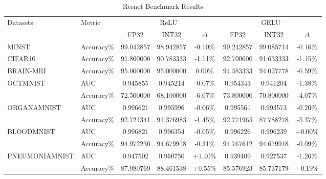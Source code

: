 \documentclass{article}
\begin{document}
\begin{table}[ht]
\centering
\caption{Resnet Benchmark Results}
\begin{tabular}{|l|l|c|c|c|c|c|c|}
\hline
\multirow{2}{*}{Datasets} & \multirow{2}{*}{Metric} & \multicolumn{3}{c|}{ReLU} & \multicolumn{3}{c|}{GELU} \\
\cline{3-8}
& & FP32 & INT32 & $\Delta$ & FP32 & INT32 & $\Delta$ \\
\hline
MINST & Accuracy\% & 99.042857 & 98.942857 & -0.10\% & 99.242857 & 99.085714 & -0.16\% \\
\hline
CIFAR10 & Accuracy\% & 91.800000 & 90.783333 & -1.11\% & 92.700000 & 91.633333 & -1.15\% \\
\hline
BRAIN-MRI & Accuracy\% & 95.000000 & 95.000000 & 0.00\% & 94.583333 & 94.027778 & -0.59\% \\
\hline
OCTMNIST & AUC & 0.945855 & 0.945214 & -0.07\% & 0.954343 & 0.941204 & -1.38\% \\
 & Accuracy\% & 72.500000 & 68.100000 & -6.07\% & 73.800000 & 70.800000 & -4.07\% \\
\hline
ORGANAMNIST & AUC & 0.996621 & 0.995996 & -0.06\% & 0.995561 & 0.993573 & -0.20\% \\
 & Accuracy\% & 92.721341 & 91.376983 & -1.45\% & 92.771965 & 87.788278 & -5.37\% \\
\hline
BLOODMNIST & AUC & 0.996821 & 0.996354 & -0.05\% & 0.996226 & 0.996239 & +0.00\% \\
 & Accuracy\% & 94.972230 & 94.679918 & -0.31\% & 94.767612 & 94.679918 & -0.09\% \\
\hline
PNEUMONIAMNIST & AUC & 0.947502 & 0.960750 & +1.40\% & 0.939409 & 0.927537 & -1.26\% \\
 & Accuracy\% & 87.980769 & 88.461538 & +0.55\% & 85.576923 & 85.737179 & +0.19\% \\
\hline
\end{tabular}
\end{table}
\end{document}
